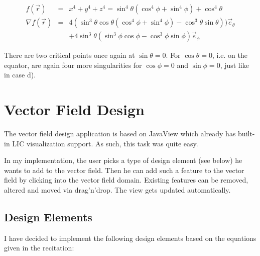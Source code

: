 \documentclass[a4paper,10pt,notitlepage]{scrartcl}
\begin{document}
\begin{eqnarray}
 f(\vec{r}) &=& x^4 + y^4 + z^4 = \sin^4 \theta ( \cos^4 \phi + \sin^4 \phi ) +
\cos^4 \theta \\
 \nabla f(\vec{r}) &=& 4 (\sin^3 \theta \cos \theta ( \cos^4 \phi + \sin^4 \phi
) - \cos^3 \theta \sin \theta)) \vec{e}_\theta \\
  && + 4 \sin^3 \theta ( \sin^3
\phi \cos \phi - \cos^3 \phi \sin \phi ) \vec{e}_\phi
\end{eqnarray}

There are two critical points once again at $\sin \theta = 0$. For $\cos \theta
= 0$, i.e. on the equator, are again four more singularities for $\cos \phi =
0$ and $\sin \phi = 0$, just like in case d).

\section{Vector Field Design}

The vector field design application is based on JavaView which already has
built-in LIC visualization support. As such, this task was quite easy.

In my implementation, the user picks a type of design element (see below) he
wants to add to the vector field. Then he can add such a feature to the vector
field by clicking into the vector field domain. Existing features can be
removed, altered and moved via drag'n'drop. The view gets updated automatically.

\subsection{Design Elements}

I have decided to implement the following design elements based on the
equations given in the recitation:
\end{document}
